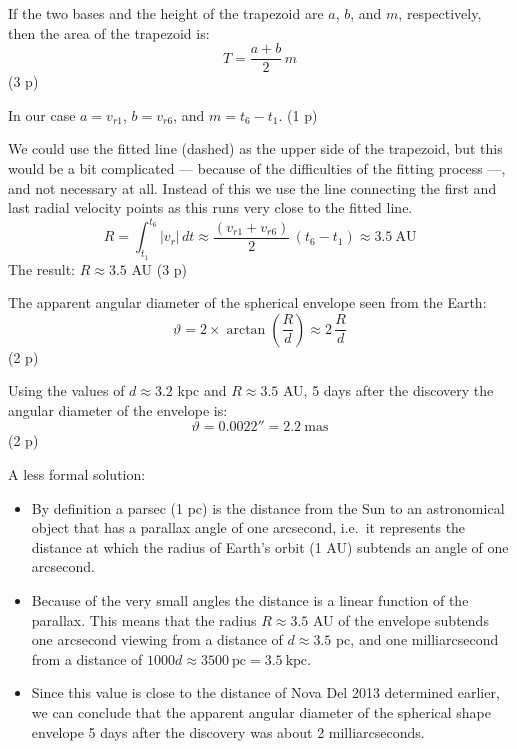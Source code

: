 \begin{description}
  If the two bases and the height of the trapezoid are $a$, $b$, and $m$,
  respectively, then the area of the trapezoid is:
  \[ T = \frac{a + b}{2}\,m
     \tag*{(1.14)} \]
  \hfill(3 p)

  In our case $a = v_{r1}$, $b = v_{r6}$, and $m = t_6 - t_1$. \hfill(1 p)

  We could use the fitted line (dashed) as the upper side of the trapezoid,
  but this would be a bit complicated --- because of the difficulties of the
  fitting process ---, and not necessary at all. Instead of this we use the
  line connecting the first and last radial velocity points as this runs very
  close to the fitted line.
  \[ R = \int_{t_1}^{t_6} |v_r|\,dt
     \approx \frac{(v_{r1} + v_{r6})}{2}\,(t_6 - t_1)
     \approx 3.5\ \mathrm{AU} \]
  The result: $R \approx 3.5$ AU \hfill(3 p)

\item[i)] The apparent angular diameter of the spherical envelope seen from
  the Earth:
  \[ \vartheta = 2 \times \arctan\left( \frac{R}{d} \right)
     \approx 2\,\frac{R}{d}
     \tag*{(1.15)} \]
  \hfill(2 p)

  Using the values of $d \approx 3.2$ kpc and $R \approx 3.5$ AU, 5 days
  after the discovery the angular diameter of the envelope is:
  \[ \vartheta = 0.0022'' = 2.2\ \mathrm{mas} \]
  \hfill(2 p)

  A less formal solution:
  \begin{itemize}
  \item By definition a parsec (1 pc) is the distance from the Sun to an
    astronomical object that has a parallax angle of one arcsecond, i.e.\ it
    represents the distance at which the radius of Earth's orbit (1 AU)
    subtends an angle of one arcsecond.
  \item Because of the very small angles the distance is a linear function of
    the parallax. This means that the radius $R \approx 3.5$ AU of the
    envelope subtends one arcsecond viewing from a distance of
    $d \approx 3.5$ pc, and one milliarcsecond from a distance of
    $1000d \approx 3500\ \mathrm{pc} = 3.5\ \mathrm{kpc}$.
  \item Since this value is close to the distance of Nova Del 2013 determined
    earlier, we can conclude that the apparent angular diameter of the
    spherical shape envelope 5 days after the discovery was about 2
    milliarcseconds.
  \end{itemize}

\end{description}
